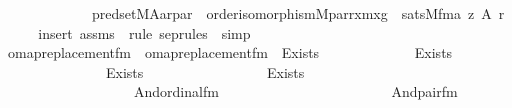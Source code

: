 \begin{isabellebody}
\ \ \ \ \ \ \ \ \ \ \ \ \ pred{\isacharunderscore}{\kern0pt}set{\isacharparenleft}{\kern0pt}{\isacharhash}{\kern0pt}{\isacharhash}{\kern0pt}M{\isacharcomma}{\kern0pt}A{\isacharcomma}{\kern0pt}a{\isacharcomma}{\kern0pt}r{\isacharcomma}{\kern0pt}par{\isacharparenright}{\kern0pt}\ {\isasymand}\ order{\isacharunderscore}{\kern0pt}isomorphism{\isacharparenleft}{\kern0pt}{\isacharhash}{\kern0pt}{\isacharhash}{\kern0pt}M{\isacharcomma}{\kern0pt}par{\isacharcomma}{\kern0pt}r{\isacharcomma}{\kern0pt}x{\isacharcomma}{\kern0pt}mx{\isacharcomma}{\kern0pt}g{\isacharparenright}{\kern0pt}{\isacharparenright}{\kern0pt}\ {\isasymlongleftrightarrow}\ sats{\isacharparenleft}{\kern0pt}M{\isacharcomma}{\kern0pt}{\isacharquery}{\kern0pt}fm{\isacharcomma}{\kern0pt}{\isacharbrackleft}{\kern0pt}a{\isacharcomma}{\kern0pt}\ z{\isacharcomma}{\kern0pt}\ A{\isacharcomma}{\kern0pt}\ r{\isacharbrackright}{\kern0pt}{\isacharparenright}{\kern0pt}{\isachardoublequoteclose}\ \isanewline
%
\isadelimproof
\ \ %
\endisadelimproof
%
\isatagproof
{}\isamarkupfalse%
\ {\isacharparenleft}{\kern0pt}insert\ assms\ {\isacharsemicolon}{\kern0pt}\ {\isacharparenleft}{\kern0pt}rule\ sep{\isacharunderscore}{\kern0pt}rules\ {\isacharbar}{\kern0pt}\ simp{\isacharparenright}{\kern0pt}{\isacharplus}{\kern0pt}{\isacharparenright}{\kern0pt}%
\endisatagproof
{\isafoldproof}%
%
\isadelimproof
\ \isanewline
%
\endisadelimproof
\isanewline
{}\isamarkupfalse%
\ omap{\isacharunderscore}{\kern0pt}replacement{\isacharunderscore}{\kern0pt}fm\ \ {\isachardoublequoteopen}omap{\isacharunderscore}{\kern0pt}replacement{\isacharunderscore}{\kern0pt}fm\ {\isasymequiv}\ Exists\isanewline
\ \ \ \ \ \ \ \ \ \ \ \ \ {\isacharparenleft}{\kern0pt}Exists\isanewline
\ \ \ \ \ \ \ \ \ \ \ \ \ \ \ {\isacharparenleft}{\kern0pt}Exists\isanewline
\ \ \ \ \ \ \ \ \ \ \ \ \ \ \ \ \ {\isacharparenleft}{\kern0pt}Exists\isanewline
\ \ \ \ \ \ \ \ \ \ \ \ \ \ \ \ \ \ \ {\isacharparenleft}{\kern0pt}And{\isacharparenleft}{\kern0pt}ordinal{\isacharunderscore}{\kern0pt}fm{\isacharparenleft}{\kern0pt}{}{\isacharparenright}{\kern0pt}{\isacharcomma}{\kern0pt}\isanewline
\ \ \ \ \ \ \ \ \ \ \ \ \ \ \ \ \ \ \ \ \ \ \ \ And{\isacharparenleft}{\kern0pt}pair{\isacharunderscore}{\kern0pt}fm{\isacharparenleft}{\kern0pt}{}{\isacharcomma}{\kern0pt}\ {}{\isacharcomma}{\kern0pt}\ {}{\isacharparenright}{\kern0pt}{\isacharcomma}{\kern0pt}\isanewline

\end{isabellebody}
